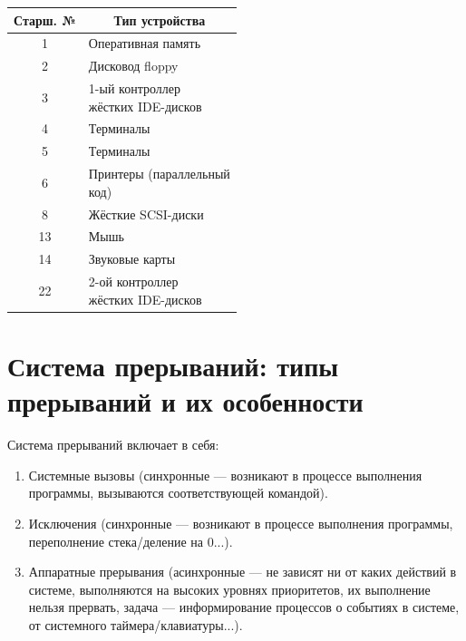 \begin{table}[H]
\begin{center}
\begin{tabular}{|c|l|}
\hline
Старш. № & \multicolumn{1}{c|}{Тип устройства} \\ \hline
1             & Оперативная память                  \\ \hline
2             & Дисковод floppy                     \\ \hline
3             & \specialcell{1-ый контроллер \\ жёстких IDE-дисков}  \\ \hline
4             & Терминалы                           \\ \hline
5             & Терминалы                           \\ \hline
6             & \specialcell{Принтеры (параллельный \\ код)}         \\ \hline
8             & Жёсткие SCSI-диски                  \\ \hline
13            & Мышь                                \\ \hline
14            & Звуковые карты                      \\ \hline
22            & \specialcell{2-ой контроллер \\ жёстких IDE-дисков}  \\ \hline
\end{tabular}
\end{center}
\end{table}

\newpage

\section{Система прерываний: типы прерываний и их особенности}

Система прерываний включает в себя:
\begin{enumerate}
	\item Системные вызовы (синхронные --- возникают в процессе выполнения программы, вызываются соответствующей командой).
	\item Исключения (синхронные --- возникают в процессе выполнения программы, переполнение стека/деление на 0...).
	\item Аппаратные прерывания (асинхронные --- не зависят ни от каких действий в системе, выполняются на высоких уровнях приоритетов, их выполнение нельзя прервать, задача --- информирование процессов о событиях в системе, от системного таймера/клавиатуры...).
\end{enumerate}

